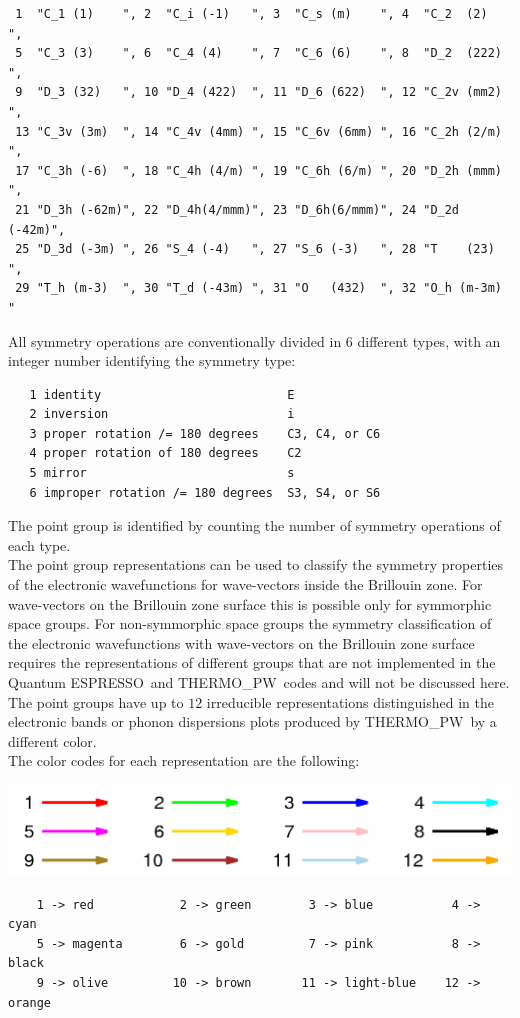 \documentclass[12pt,a4paper]{article}
\def\qe{{\sc Quantum ESPRESSO}}
\def\tpw{{\sc THERMO\_PW}}
\begin{document}
\begin{verbatim}
 1  "C_1 (1)    ", 2  "C_i (-1)   ", 3  "C_s (m)    ", 4  "C_2  (2)   ", 
 5  "C_3 (3)    ", 6  "C_4 (4)    ", 7  "C_6 (6)    ", 8  "D_2  (222) ", 
 9  "D_3 (32)   ", 10 "D_4 (422)  ", 11 "D_6 (622)  ", 12 "C_2v (mm2) ", 
 13 "C_3v (3m)  ", 14 "C_4v (4mm) ", 15 "C_6v (6mm) ", 16 "C_2h (2/m) ", 
 17 "C_3h (-6)  ", 18 "C_4h (4/m) ", 19 "C_6h (6/m) ", 20 "D_2h (mmm) ", 
 21 "D_3h (-62m)", 22 "D_4h(4/mmm)", 23 "D_6h(6/mmm)", 24 "D_2d (-42m)", 
 25 "D_3d (-3m) ", 26 "S_4 (-4)   ", 27 "S_6 (-3)   ", 28 "T    (23)  ", 
 29 "T_h (m-3)  ", 30 "T_d (-43m) ", 31 "O   (432)  ", 32 "O_h (m-3m) "  
\end{verbatim}
All symmetry operations are conventionally divided in $6$ 
different types, with an integer number identifying the symmetry type:
\begin{verbatim}
   1 identity                          E
   2 inversion                         i
   3 proper rotation /= 180 degrees    C3, C4, or C6
   4 proper rotation of 180 degrees    C2
   5 mirror                            s
   6 improper rotation /= 180 degrees  S3, S4, or S6
\end{verbatim}
The point group is identified by counting the number of symmetry operations of 
each type. \\
The point group representations can be used to classify the symmetry properties 
of the electronic wavefunctions for wave-vectors inside the Brillouin zone. 
For wave-vectors on the Brillouin zone surface this is possible only for 
symmorphic space groups. For non-symmorphic space groups the symmetry classification
of the electronic wavefunctions with wave-vectors on the Brillouin zone surface
requires the representations of different groups that are not implemented 
in the \qe\ and \tpw\ codes and will not be discussed here.
The point groups have up to $12$ irreducible 
representations distinguished in the electronic bands or phonon dispersions
plots produced by \tpw\ by a different color. \\
The color codes for each representation are the following:
\begin{center}
\includegraphics[width=16cm]{color.png} 
\end{center}
\begin{verbatim}
    1 -> red            2 -> green        3 -> blue           4 -> cyan
    5 -> magenta        6 -> gold         7 -> pink           8 -> black
    9 -> olive         10 -> brown       11 -> light-blue    12 -> orange
\end{verbatim} 
\end{document}

